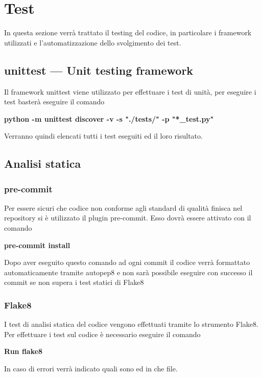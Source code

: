 \section{Test}

In questa sezione verrà trattato il testing del codice, in particolare i framework utilizzati e l'automatizzazione dello svolgimento dei test.

\subsection{unittest — Unit testing framework}

Il framework unittest viene utilizzato per effettuare i test di unità, per eseguire i test basterà eseguire il comando 

\centerline{ \textbf{python -m unittest discover -v -s "./tests/" -p "*\_test.py"}}

Verranno quindi elencati tutti i test eseguiti ed il loro risultato.


\subsection{Analisi statica}

\subsubsection{pre-commit}

Per essere sicuri che codice non conforme agli standard di qualità finisca nel repository si è utilizzato il plugin pre-commit. Esso dovrà essere attivato con il comando

\centerline{\textbf{pre-commit install}}

Dopo aver eseguito questo comando ad ogni commit il codice verrà formattato automaticamente tramite autopep8 e non sarà possibile eseguire con successo il commit se non supera i test statici di Flake8

\subsubsection{Flake8}

I test di analisi statica del codice vengono effettuati tramite lo strumento Flake8. Per effettuare i test sul codice è necessario eseguire il comando\newline{}
\centerline{\textbf{Run flake8}}\newline{}
In caso di errori verrà indicato quali sono ed in che file. 

